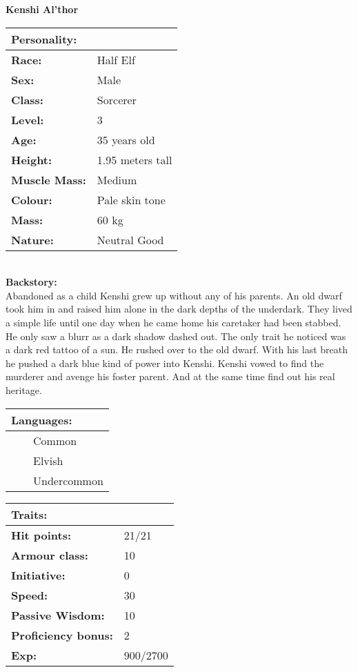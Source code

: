 \documentclass[11pt]{article}
\newcommand{\tabitem}{~~\llap{--}~~}
\begin{document}
	\begin{center}
\Huge \textbf{Kenshi Al'thor}
	\end{center}
	\begin{multicols}{2}
\noindent \begin{tabularx}{95mm}{@{}l l}
\Large \textbf{Personality:} 	& 						\\
\hline
\textbf{Race:} 					& Half Elf	 			\\
\textbf{Sex:} 					& Male 					\\
\textbf{Class:}					& Sorcerer				\\
\textbf{Level:} 				& 3		 				\\
\textbf{Age:} 					& 35 years old			\\
\textbf{Height:} 				& 1.95 meters tall 		\\
\textbf{Muscle Mass:} 			& Medium 				\\
\textbf{Colour:} 				& Pale skin tone	 	\\
\textbf{Mass:} 					& 60 kg		 			\\
\textbf{Nature:} 				& Neutral Good	 		\\
		\end{tabularx} \\
\textbf{Backstory:} \\
Abandoned as a child Kenshi grew up without any of his parents. An old dwarf took him in and raised him alone in the dark depths of the underdark. They lived a simple life until one day when he came home his caretaker had been stabbed. He only saw a blurr as a dark shadow dashed out. The only trait he noticed was a dark red tattoo of a sun. He rushed over to the old dwarf. With his last breath he pushed a dark blue kind of power into Kenshi. Kenshi vowed to find the murderer and avenge his foster parent. And at the same time find out his real heritage.

\noindent \begin{tabularx}{95mm}{@{}l}
{\Large \textbf{Languages:}} \\
\hline
\tabitem Common \\
\tabitem Elvish \\
\tabitem Undercommon
		\end{tabularx}

\vspace{4mm}

\noindent \begin{tabularx}{95mm}{@{}l l}
\Large \textbf{Traits:}		 	& 									\\
\hline
\textbf{Hit points:} 			& 21/21 							\\
\textbf{Armour class:} 			& 10							 	\\
\textbf{Initiative:} 			& 0									\\
\textbf{Speed:} 				& 30		 						\\
\textbf{Passive Wisdom:} 		& 10			 					\\
\textbf{Proficiency bonus:}		& 2									\\
\textbf{Exp:} 					& 900/2700 							\\
		\end{tabularx}


\end{multicols}
\end{document}
